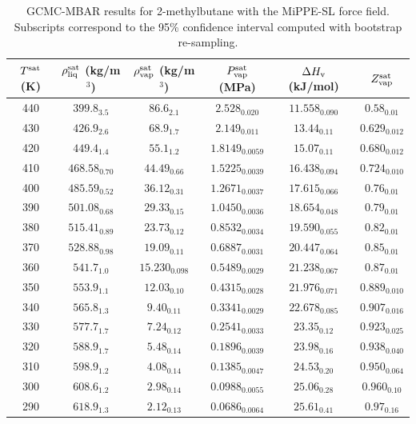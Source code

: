 \documentclass[journal=jctc,manuscript=article]{achemso}
\begin{document}
\begin{table}[htb!]
	\caption{GCMC-MBAR results for 2-methylbutane with the MiPPE-SL force field. Subscripts correspond to the 95\% confidence interval computed with bootstrap re-sampling.}
	\begin{center}
		\begin{tabular}{|c|c|c|c|c|c|}
			\hline
			$T^{\rm sat}$ (K) & $\rho_{\rm liq}^{\rm sat}$ (kg/m$^3$) & $\rho_{\rm vap}^{\rm sat}$ (kg/m$^3$) & $P_{\rm vap}^{\rm sat}$ (MPa) & $\Delta H_{\rm v}$ (kJ/mol) & $Z_{\rm vap}^{\rm sat}$ \\ \hline
			440 & $399.8_{3.5}$ & $86.6_{2.1}$ & $2.528_{0.020}$ & $11.558_{0.090}$ & $0.58_{0.01}$ \\
			430 & $426.9_{2.6}$ & $68.9_{1.7}$ & $2.149_{0.011}$ & $13.44_{0.11}$ & $0.629_{0.012}$ \\
			420 & $449.4_{1.4}$ & $55.1_{1.2}$ & $1.8149_{0.0059}$ & $15.07_{0.11}$ & $0.680_{0.012}$ \\
			410 & $468.58_{0.70}$ & $44.49_{0.66}$ & $1.5225_{0.0039}$ & $16.438_{0.094}$ & $0.724_{0.010}$ \\
			400 & $485.59_{0.52}$ & $36.12_{0.31}$ & $1.2671_{0.0037}$ & $17.615_{0.066}$ & $0.76_{0.01}$ \\
			390 & $501.08_{0.68}$ & $29.33_{0.15}$ & $1.0450_{0.0036}$ & $18.654_{0.048}$ & $0.79_{0.01}$ \\
			380 & $515.41_{0.89}$ & $23.73_{0.12}$ & $0.8532_{0.0034}$ & $19.590_{0.055}$ & $0.82_{0.01}$ \\
			370 & $528.88_{0.98}$ & $19.09_{0.11}$ & $0.6887_{0.0031}$ & $20.447_{0.064}$ & $0.85_{0.01}$ \\
			360 & $541.7_{1.0}$ & $15.230_{0.098}$ & $0.5489_{0.0029}$ & $21.238_{0.067}$ & $0.87_{0.01}$ \\
			350 & $553.9_{1.1}$ & $12.03_{0.10}$ & $0.4315_{0.0028}$ & $21.976_{0.071}$ & $0.889_{0.010}$ \\
			340 & $565.8_{1.3}$ & $9.40_{0.11}$ & $0.3341_{0.0029}$ & $22.678_{0.085}$ & $0.907_{0.016}$ \\
			330 & $577.7_{1.7}$ & $7.24_{0.12}$ & $0.2541_{0.0033}$ & $23.35_{0.12}$ & $0.923_{0.025}$ \\
			320 & $588.9_{1.7}$ & $5.48_{0.14}$ & $0.1896_{0.0039}$ & $23.98_{0.16}$ & $0.938_{0.040}$ \\
			310 & $598.9_{1.2}$ & $4.08_{0.14}$ & $0.1385_{0.0047}$ & $24.53_{0.20}$ & $0.950_{0.064}$ \\
			300 & $608.6_{1.2}$ & $2.98_{0.14}$ & $0.0988_{0.0055}$ & $25.06_{0.28}$ & $0.960_{0.10}$ \\
			290 & $618.9_{1.3}$ & $2.12_{0.13}$ & $0.0686_{0.0064}$ & $25.61_{0.41}$ & $0.97_{0.16}$ \\
			\hline
		\end{tabular}
	\end{center}
\end{table}
\end{document}
